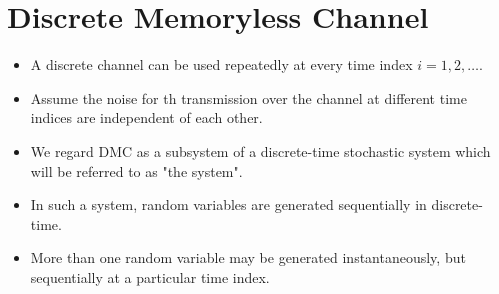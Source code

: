 \documentclass[../main.tex]{subfiles}
\begin{document}
\section{Discrete Memoryless Channel}
\begin{itemize}
    \item A discrete channel can be used repeatedly at every time index $i=1,2,\dots$.
    \item Assume the noise for th transmission over the channel at different time indices are independent of each other.
    \item We regard DMC as a subsystem of a discrete-time stochastic system which will be referred to as "the system".
    \item In such a system, random variables are generated sequentially in discrete-time.
    \item More than one random variable may be generated instantaneously, but sequentially at a particular time index.
\end{itemize}
\end{document}
